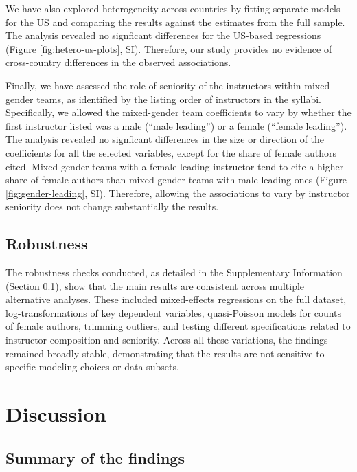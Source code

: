 \documentclass[
  british,
  11pt,
]{article}
\begin{document}
We have also explored heterogeneity across countries by fitting separate models for the US and comparing the results against the estimates from the full sample. The analysis revealed no signficant differences for the US-based regressions (Figure \ref{fig:hetero-us-plots}, SI). Therefore, our study provides no evidence of cross-country differences in the observed associations.

Finally, we have assessed the role of seniority of the instructors within mixed-gender teams, as identified by the listing order of instructors in the syllabi. Specifically, we allowed the mixed-gender team coefficients to vary by whether the first instructor listed was a male (``male leading'') or a female (``female leading''). The analysis revealed no signficant differences in the size or direction of the coefficients for all the selected variables, except for the share of female authors cited. Mixed-gender teams with a female leading instructor tend to cite a higher share of female authors than mixed-gender teams with male leading ones (Figure \ref{fig:gender-leading}, SI). Therefore, allowing the associations to vary by instructor seniority does not change substantially the results.

\subsection{Robustness}\label{robustness}

The robustness checks conducted, as detailed in the Supplementary Information (Section \ref{robustness}), show that the main results are consistent across multiple alternative analyses. These included mixed-effects regressions on the full dataset, log-transformations of key dependent variables, quasi-Poisson models for counts of female authors, trimming outliers, and testing different specifications related to instructor composition and seniority. Across all these variations, the findings remained broadly stable, demonstrating that the results are not sensitive to specific modeling choices or data subsets.

\section{Discussion}\label{discussion}

\subsection{Summary of the findings}\label{summary-of-the-findings}
\end{document}
